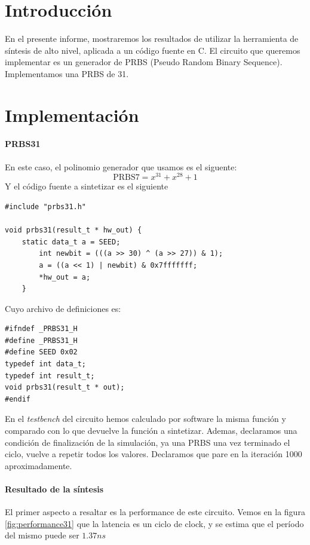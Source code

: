 
\everymath{\displaystyle} %


\section{Introducción}
En el presente informe, mostraremos los resultados de utilizar la herramienta de síntesis de alto nivel, aplicada a un código fuente en C. El circuito que queremos implementar es un generador de PRBS (Pseudo Random Binary Sequence). Implementamos una PRBS de 31.

\section{Implementación}
\paragraph{PRBS31}
En este caso, el polinomio generador que usamos es el siguente:
\begin{equation*}
\mbox{PRBS7} = x^{31} + x^{28} + 1
\end{equation*}
Y el código fuente a sintetizar es el siguiente
\begin{lstlisting}
#include "prbs31.h"

void prbs31(result_t * hw_out) {
    static data_t a = SEED;
        int newbit = (((a >> 30) ^ (a >> 27)) & 1);
        a = ((a << 1) | newbit) & 0x7fffffff;
        *hw_out = a;
    }
\end{lstlisting}
Cuyo archivo de definiciones es:
\begin{lstlisting}
#ifndef _PRBS31_H
#define _PRBS31_H
#define SEED 0x02
typedef int data_t;
typedef int result_t;
void prbs31(result_t * out);
#endif
\end{lstlisting}

En el \emph{testbench} del circuito hemos calculado por software la misma función y comparado con lo que devuelve la función a sintetizar. Ademas, declaramos una condición de finalización de la simulación, ya una PRBS una vez terminado el ciclo, vuelve a repetir todos los valores. Declaramos que pare en la iteración 1000 aproximadamente.

\paragraph{Resultado de la síntesis} El primer aspecto a resaltar es la performance de este circuito. Vemos en la figura \ref{fig:performance31} que la latencia es un ciclo de clock, y se estima que el período del mismo puede ser $1.37ns$

